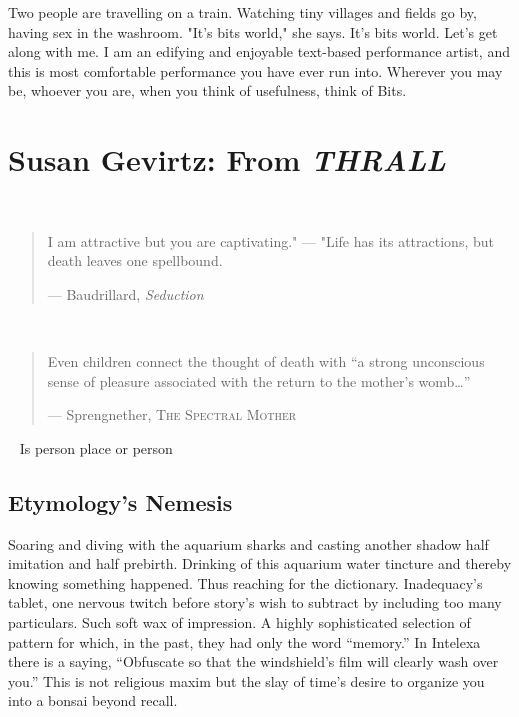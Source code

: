 \documentclass[
]{memoir}
\begin{document}
Two people are travelling on a train. Watching tiny villages and fields
go by, having sex in the washroom. "It's bits world," she says. It's
bits world. Let's get along with me. I am an edifying and enjoyable
text-based performance artist, and this is most comfortable performance
you have ever run into. Wherever you may be, whoever you are, when you
think of usefulness, think of Bits.

\hypertarget{susan-gevirtz-from-thrall}{%
\chapter{\texorpdfstring{Susan Gevirtz: From
\emph{THRALL}}{Susan Gevirtz: From THRALL}}\label{susan-gevirtz-from-thrall}}

~

\begin{quote}
I am attractive but you are captivating." --- "Life has its attractions,
but death leaves one spellbound.

--- Baudrillard, \emph{Seduction}
\end{quote}

~

\begin{quote}
Even children connect the thought of death with ``a strong unconscious
sense of pleasure associated with the return to the mother's
womb\ldots{}''

--- Sprengnether, \textsc{The Spectral Mother}
\end{quote}

~ Is person place or person

\hypertarget{etymologys-nemesis}{%
\section*{Etymology's Nemesis}\label{etymologys-nemesis}}

Soaring and diving with the aquarium sharks and casting another shadow
half imitation and half prebirth. Drinking of this aquarium water
tincture and thereby knowing something happened. Thus reaching for the
dictionary. Inadequacy's tablet, one nervous twitch before story's wish
to subtract by including too many particulars. Such soft wax of
impression. A highly sophisticated selection of pattern for which, in
the past, they had only the word ``memory.'' In Intelexa there is a
saying, ``Obfuscate so that the windshield's film will clearly wash over
you.'' This is not religious maxim but the slay of time's desire to
organize you into a bonsai beyond recall.
\end{document}
